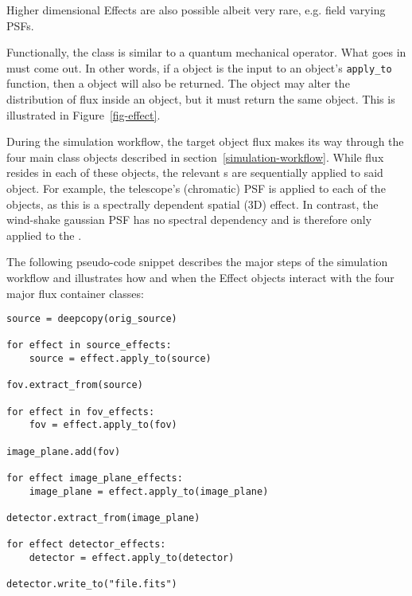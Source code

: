 Higher dimensional Effects are also possible albeit very rare, e.g. field varying PSFs.

Functionally, the \Effect{} class is similar to a quantum mechanical operator.
What goes in must come out.
In other words, if a \Source{} object is the input to an \Effect{} object's \lstinline{apply_to} function, then a \Source{} object will also be returned.
The \Effect{} object may alter the distribution of flux inside an object, but it must return the same object.
This is illustrated in Figure~\ref{fig-effect}.

During the simulation workflow, the target object flux makes its way through the four main class objects described in section~\ref{simulation-workflow}.
While flux resides in each of these objects, the relevant \Effect{}s are sequentially applied to said object.
For example, the telescope's (chromatic) PSF is applied to each of the \FieldOfView{} objects, as this is a spectrally dependent spatial (3D) effect.
In contrast, the wind-shake gaussian PSF has no spectral dependency and is therefore only applied to the \ImagePlane{}.

The following pseudo-code snippet describes the major steps of the simulation workflow and illustrates how and when the Effect objects interact with the four major flux container classes:

\begin{lstlisting}[frame=single]
source = deepcopy(orig_source)

for effect in source_effects:
    source = effect.apply_to(source)

fov.extract_from(source)

for effect in fov_effects:
    fov = effect.apply_to(fov)

image_plane.add(fov)

for effect image_plane_effects:
    image_plane = effect.apply_to(image_plane)

detector.extract_from(image_plane)

for effect detector_effects:
    detector = effect.apply_to(detector)

detector.write_to("file.fits")
\end{lstlisting}

